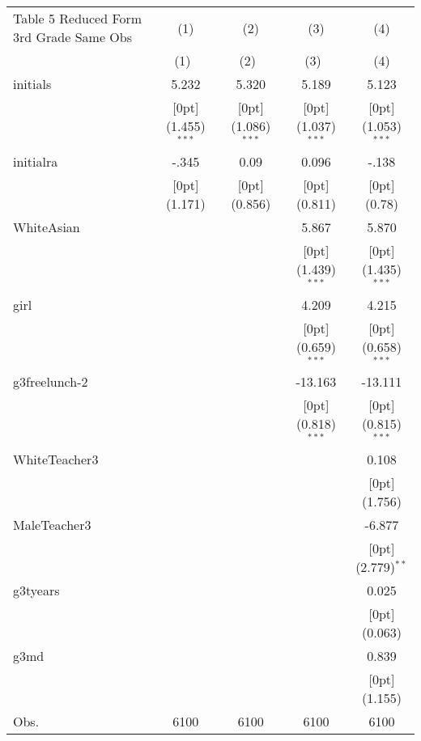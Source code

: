 \documentclass[a4paper,11pt]{article}
\begin{document}
	
\begin{table}
	\small
\begin{tabular*}{\textwidth}{@{\extracolsep{\fill}}lcccc}				
	Table 5 Reduced Form 3rd Grade Same Obs & \multicolumn{1}{c}{(1)} &	\multicolumn{1}{c}{(2)} &	\multicolumn{1}{c}{(3)} &	\multicolumn{1}{c}{(4)} \\
	\cline{2-5}				
	& \multicolumn{1}{c}{(1)\mbox{\ }} &	\multicolumn{1}{c}{(2)\mbox{\ }} &	\multicolumn{1}{c}{(3)\mbox{\ }} &	\multicolumn{1}{c}{(4)} \\
	\hline				
	initials &	5.232 &	5.320 &	5.189 &	5.123 \\
	&	\raisebox{.7ex}[0pt]{\scriptsize (1.455)$^{***}$} &	\raisebox{.7ex}[0pt]{\scriptsize (1.086)$^{***}$} &	\raisebox{.7ex}[0pt]{\scriptsize (1.037)$^{***}$} &	\raisebox{.7ex}[0pt]{\scriptsize (1.053)$^{***}$} \\
	initialra &	-.345 &	0.09 &	0.096 &	-.138 \\
	&	\raisebox{.7ex}[0pt]{\scriptsize (1.171)} &	\raisebox{.7ex}[0pt]{\scriptsize (0.856)} &	\raisebox{.7ex}[0pt]{\scriptsize (0.811)} &	\raisebox{.7ex}[0pt]{\scriptsize (0.78)} \\
	WhiteAsian &	&	&	5.867 &	5.870 \\
	&	&	&	\raisebox{.7ex}[0pt]{\scriptsize (1.439)$^{***}$} &	\raisebox{.7ex}[0pt]{\scriptsize (1.435)$^{***}$} \\
	girl &	&	&	4.209 &	4.215 \\
	&	&	&	\raisebox{.7ex}[0pt]{\scriptsize (0.659)$^{***}$} &	\raisebox{.7ex}[0pt]{\scriptsize (0.658)$^{***}$} \\
	g3freelunch-2 &	&	&	-13.163 &	-13.111 \\
	&	&	&	\raisebox{.7ex}[0pt]{\scriptsize (0.818)$^{***}$} &	\raisebox{.7ex}[0pt]{\scriptsize (0.815)$^{***}$} \\
	WhiteTeacher3 &	&	&	&	0.108 \\
	&	&	&	&	\raisebox{.7ex}[0pt]{\scriptsize (1.756)} \\
	MaleTeacher3 &	&	&	&	-6.877 \\
	&	&	&	&	\raisebox{.7ex}[0pt]{\scriptsize (2.779)$^{**}$} \\
	g3tyears &	&	&	&	0.025 \\
	&	&	&	&	\raisebox{.7ex}[0pt]{\scriptsize (0.063)} \\
	g3md &	&	&	&	0.839 \\
	&	&	&	&	\raisebox{.7ex}[0pt]{\scriptsize (1.155)} \\
	Obs. &	6100 &	6100 &	6100 &	6100 \\
	\hline\hline				
\end{tabular*}
\end{table}	
\end{document}
